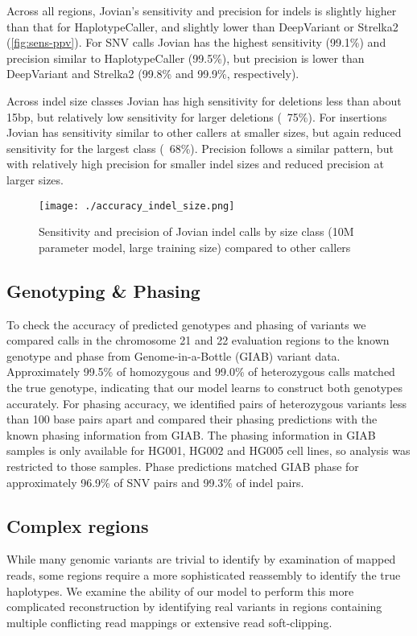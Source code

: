 \documentclass[]{article}
\begin{document}
Across all regions, Jovian's sensitivity and precision for indels is slightly higher than that for HaplotypeCaller, and slightly lower than DeepVariant or Strelka2 (\ref{fig:sens-ppv}). For SNV calls Jovian has the highest sensitivity (99.1\%) and precision similar to HaplotypeCaller (99.5\%), but precision is lower than DeepVariant and Strelka2 (99.8\% and 99.9\%, respectively).


Across indel size classes Jovian has high sensitivity for deletions less than about 15bp, but relatively low sensitivity for larger deletions (~75\%). For insertions Jovian has sensitivity similar to other callers at smaller sizes, but again reduced sensitivity for the largest class (~68\%). Precision follows a similar pattern, but with relatively high precision for smaller indel sizes and reduced precision at larger sizes. 

\begin{figure}[htp]
	\texttt{[image: ./accuracy\_indel\_size.png]}
	\caption{ Sensitivity and precision of Jovian indel calls by size class (10M parameter model, large training size) compared to other callers }
	\label{fig:indelsize-sens-ppv}
\end{figure}


\subsection{Genotyping \& Phasing}

To check the accuracy of predicted genotypes and phasing of variants we compared calls in the chromosome 21 and 22 evaluation regions to the known genotype and phase from Genome-in-a-Bottle (GIAB) variant data. Approximately 99.5\% of homozygous and 99.0\% of heterozygous calls matched the true genotype, indicating that our model learns to construct both genotypes accurately.  For phasing accuracy, we identified pairs of heterozygous variants less than 100 base pairs apart and compared their phasing predictions with the known phasing information from GIAB. The phasing information in GIAB samples is only available for HG001, HG002 and HG005 cell lines, so analysis was restricted to those samples. Phase predictions matched GIAB phase for approximately 96.9\% of SNV pairs and 99.3\% of indel pairs.


\subsection{Complex regions}
While many genomic variants are trivial to identify by examination of mapped reads, some regions require a more sophisticated reassembly to identify the true haplotypes. We examine the ability of our model to perform this more complicated reconstruction by identifying real variants in regions containing multiple conflicting read mappings or extensive read soft-clipping. 
 
\end{document}
